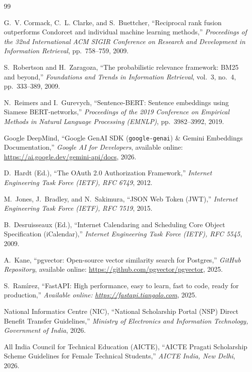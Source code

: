 \documentclass[12pt,a4paper,oneside]{report}
\begin{document}
\begin{thebibliography}{99}

G.~V. Cormack, C.~L. Clarke, and S.~Buettcher,
``Reciprocal rank fusion outperforms Condorcet and individual machine learning methods,''
\emph{Proceedings of the 32nd International ACM SIGIR Conference on Research and Development in Information Retrieval}, pp.~758--759, 2009.

S.~Robertson and H.~Zaragoza,
``The probabilistic relevance framework: BM25 and beyond,''
\emph{Foundations and Trends in Information Retrieval}, vol.~3, no.~4, pp.~333--389, 2009.

N.~Reimers and I.~Gurevych,
``Sentence-BERT: Sentence embeddings using Siamese BERT-networks,''
\emph{Proceedings of the 2019 Conference on Empirical Methods in Natural Language Processing (EMNLP)}, pp.~3982--3992, 2019.

Google DeepMind,
``Google GenAI SDK (\texttt{google-genai}) \& Gemini Embeddings Documentation,''
\emph{Google AI for Developers}, available online: \url{https://ai.google.dev/gemini-api/docs}, 2026.

D.~Hardt (Ed.),
``The OAuth 2.0 Authorization Framework,''
\emph{Internet Engineering Task Force (IETF), RFC 6749}, 2012.

M.~Jones, J.~Bradley, and N.~Sakimura,
``JSON Web Token (JWT),''
\emph{Internet Engineering Task Force (IETF), RFC 7519}, 2015.

B.~Desruisseaux (Ed.),
``Internet Calendaring and Scheduling Core Object Specification (iCalendar),''
\emph{Internet Engineering Task Force (IETF), RFC 5545}, 2009.

A.~Kane,
``pgvector: Open-source vector similarity search for Postgres,''
\emph{GitHub Repository}, available online: \url{https://github.com/pgvector/pgvector}, 2025.

S.~Ram{\'\i}rez,
``FastAPI: High performance, easy to learn, fast to code, ready for production,''
\emph{Available online: \url{https://fastapi.tiangolo.com}}, 2025.

National Informatics Centre (NIC),
``National Scholarship Portal (NSP) Direct Benefit Transfer Guidelines,''
\emph{Ministry of Electronics and Information Technology, Government of India}, 2026.

All India Council for Technical Education (AICTE),
``AICTE Pragati Scholarship Scheme Guidelines for Female Technical Students,''
\emph{AICTE India, New Delhi}, 2026.

\end{thebibliography}
\end{document}
